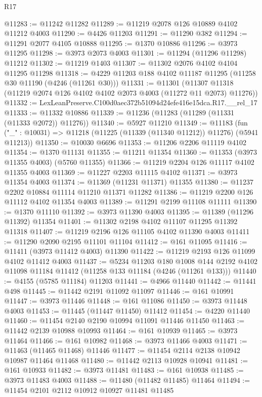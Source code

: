 \begin{lexlean}{R17}
\begin{coremodule}
@11283 := @11242 @11282
@11289 := @11219 @2078 @126 @10889 @4102 @11212 @4003
@11290 := @4426 @11203
@11291 := @11290 @382
@11294 := @11291 @2077 @4105 @10888
@11295 := @1370 @10886
@11296 := @3973 @11295
@11298 := @3973 @2073 @4003
@11301 := @11294 (@11296 @11298) @11212
@11302 := @11219 @1403
@11307 := @11302 @2076 @4102 @4104 @11295 @11298
@11318 := @4229 @11203 @188 @4102 @11187 @11295 (@11258 @30 @11190 (@4246 (@11261 @30)))
@11331 := @11301
    (@11307 @11318 (@11219 @2074 @126 @4102 @4102 @2073 @4003 (@11272 @11 @2073) @11276))
@11332 := LexLeanPreserve.C100d0aec372b51094d24efe416e15dca.R17.__rel_17
@11333 := @11332 @10886
@11339 := @11236 (@11283 (@11289 (@11331 (@11333 @2072)) @11276))
@11340 := @5927 @11210
@11349 := @11183
    (fun ("_" : @10031) => @11218 (@11225 (@11339 (@11340 @11212)) @11276) (@5941 @11213))
@11350 := @10030 @6696
@11353 := @11206 @2206 @11119 @4102
@11354 := @1370 @11131
@11355 := @11211 @11354
@11360 := @11353 (@3973 @11355 @4003) (@5760 @11355)
@11366 := @11219 @2204 @126 @11117 @4102 @11355 @4003
@11369 := @11227 @2203 @11115 @4102
@11371 := @3973 @11354 @4003
@11374 := @11369 (@11231 @11371) @11355
@11380 := @11237 @2202 @10884 @11114 @11210 @11371 @11282
@11386 := @11219 @2200 @126 @11112 @4102 @11354 @4003
@11389 := @11291 @2199 @11108 @11111
@11390 := @1370 @11110
@11392 := @3973 @11390 @4003
@11395 := @11389 (@11296 @11392) @11354
@11401 := @11302 @2198 @4102 @11107 @11295 @11392 @11318
@11407 := @11219 @2196 @126 @11105 @4102 @11390 @4003
@11411 := @11290 @2090 @2195 @11101 @11104
@11412 := @161 @11095
@11416 := @11411 (@3973 @11412 @4003) @11390
@11422 := @11219 @2193 @126 @11099 @4102 @11412 @4003
@11437 := @5234
    @11203
    @180
    @1008
    @144
    @2192
    @4102
    @11098
    @11184
    @11412
    (@11258 @133 @11184 (@4246 (@11261 @133)))
@11440 := @4155 (@5785 @11184) @11203
@11441 := @4966 @11440
@11442 := @11441 @498
@11445 := @11442 @2191 @11092 @11097
@11446 := @161 @10991
@11447 := @3973 @11446
@11448 := @161 @11086
@11450 := @3973 @11448 @4003
@11453 := @11445 (@11447 @11450) @11412
@11454 := @4220 @11440
@11460 := @11454 @2140 @2190 @10994 @11091 @11446 @11450
@11463 := @11442 @2139 @10988 @10993
@11464 := @161 @10939
@11465 := @3973 @11464
@11466 := @161 @10982
@11468 := @3973 @11466 @4003
@11471 := @11463 (@11465 @11468) @11446
@11477 := @11454 @2114 @2138 @10942 @10987 @11464 @11468
@11480 := @11442 @2113 @10928 @10941
@11481 := @161 @10933
@11482 := @3973 @11481
@11483 := @161 @10938
@11485 := @3973 @11483 @4003
@11488 := @11480 (@11482 @11485) @11464
@11494 := @11454 @2101 @2112 @10912 @10927 @11481 @11485

\end{coremodule}
\end{lexlean}
